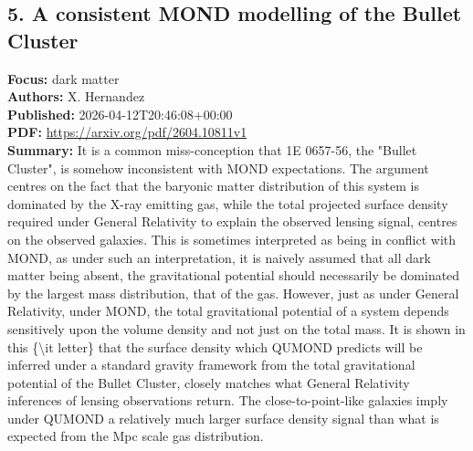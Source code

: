 \documentclass[11pt]{article}
\begin{document}
\subsection*{5. A consistent MOND modelling of the Bullet Cluster}
\textbf{Focus:} dark matter\\
\textbf{Authors:} X. Hernandez\\
\textbf{Published:} 2026-04-12T20:46:08+00:00\\
\textbf{PDF:} \href{https://arxiv.org/pdf/2604.10811v1}{https://arxiv.org/pdf/2604.10811v1}\\
\textbf{Summary:}
It is a common miss-conception that 1E 0657-56, the "Bullet Cluster", is somehow inconsistent with MOND expectations. The argument centres on the fact that the baryonic matter distribution of this system is dominated by the X-ray emitting gas, while the total projected surface density required under General Relativity to explain the observed lensing signal, centres on the observed galaxies. This is sometimes interpreted as being in conflict with MOND, as under such an interpretation, it is naively assumed that all dark matter being absent, the gravitational potential should necessarily be dominated by the largest mass distribution, that of the gas. However, just as under General Relativity, under MOND, the total gravitational potential of a system depends sensitively upon the volume density and not just on the total mass. It is shown in this \{\textbackslash{}it letter\} that the surface density which QUMOND predicts will be inferred under a standard gravity framework from the total gravitational potential of the Bullet Cluster, closely matches what General Relativity inferences of lensing observations return. The close-to-point-like galaxies imply under QUMOND a relatively much larger surface density signal than what is expected from the Mpc scale gas distribution.
\newpage
\end{document}
